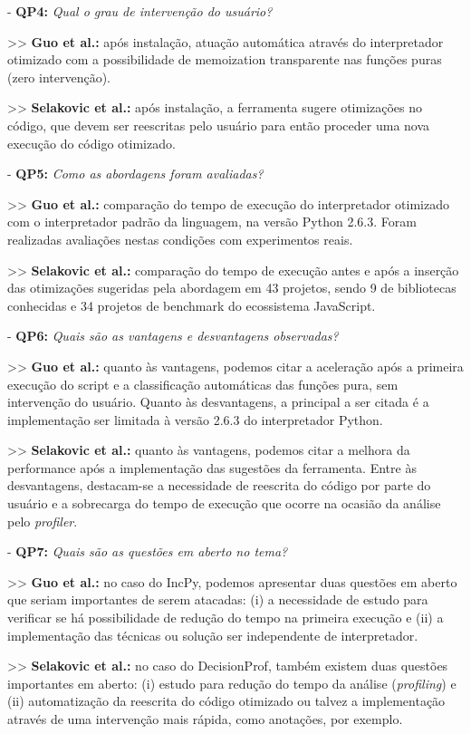 \documentclass[sigconf]{acmart}
\begin{document}
- \textbf{QP4:} {\textit{Qual o grau de intervenção do usuário?}}

>> \textbf{Guo et al.:} após instalação, atuação automática através do interpretador otimizado com a possibilidade de memoization transparente nas funções puras (zero intervenção).

>> \textbf{Selakovic et al.:} após instalação, a ferramenta sugere otimizações no código, que devem ser reescritas pelo usuário para então proceder uma nova execução do código otimizado.

- \textbf{QP5:} {\textit{Como as abordagens foram avaliadas?}}

>> \textbf{Guo et al.:} comparação do tempo de execução do interpretador otimizado com o interpretador padrão da linguagem, na versão Python 2.6.3. Foram realizadas avaliações nestas condições com experimentos reais.

>> \textbf{Selakovic et al.:} comparação do tempo de execução antes e após a inserção das otimizações sugeridas pela abordagem em 43 projetos, sendo 9 de bibliotecas conhecidas e 34 projetos de benchmark do ecossistema JavaScript.

- \textbf{QP6:} {\textit{Quais são as vantagens e desvantagens observadas?}}

>> \textbf{Guo et al.:} quanto às vantagens, podemos citar a aceleração após a primeira execução do script e a classificação automáticas das funções pura, sem intervenção do usuário. Quanto às desvantagens, a principal a ser citada é a implementação ser limitada à versão 2.6.3 do interpretador Python.

>> \textbf{Selakovic et al.:} quanto às vantagens, podemos citar a melhora da performance após a implementação das sugestões da ferramenta. Entre às desvantagens, destacam-se a necessidade de reescrita do código por parte do usuário e a sobrecarga do tempo de execução que ocorre na ocasião da análise pelo \textit{profiler}.

- \textbf{QP7:} {\textit{Quais são as questões em aberto no tema?}}

>> \textbf{Guo et al.:} no caso do IncPy, podemos apresentar duas questões em aberto que seriam importantes de serem atacadas: (i) a necessidade de estudo para verificar se há possibilidade de redução do tempo na primeira execução e (ii) a implementação das técnicas ou solução ser independente de interpretador.

>> \textbf{Selakovic et al.:} no caso do DecisionProf, também existem duas questões importantes em aberto: (i) estudo para redução do tempo da análise (\textit{profiling}) e (ii) automatização da reescrita do código otimizado ou talvez a implementação através de uma intervenção mais rápida, como anotações, por exemplo.
\end{document}
